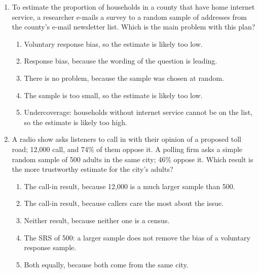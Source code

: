 \documentclass[12pt]{article}
\begin{document}
\begin{enumerate}[leftmargin=1.9em, itemsep=0.13in]
  \boxguard[13]
  \item To estimate the proportion of households in a county that have home internet service,
        a researcher e-mails a survey to a random sample of addresses from the county's
        e-mail newsletter list. Which is the main problem with this plan?
        \begin{enumerate}[label=\textbf{(\Alph*)}, leftmargin=2.2em, itemsep=2pt]
          \item Voluntary response bias, so the estimate is likely too low.
          \item Response bias, because the wording of the question is leading.
          \item There is no problem, because the sample was chosen at random.
          \item The sample is too small, so the estimate is likely too low.
          \item Undercoverage: households without internet service cannot be on the list,\\
                so the estimate is likely too high.\hfill{}\rule[-0.2in]{0pt}{0.48in}
        \end{enumerate}

  \boxguard[14]
  \item A radio show asks listeners to call in with their opinion of a proposed toll road;
        12{,}000 call, and 74\% of them oppose it. A polling firm asks a simple random sample
        of 500 adults in the same city; 46\% oppose it. Which result is the more trustworthy
        estimate for the city's adults?
        \begin{enumerate}[label=\textbf{(\Alph*)}, leftmargin=2.2em, itemsep=2pt]
          \item The call-in result, because 12{,}000 is a much larger sample than 500.
          \item The call-in result, because callers care the most about the issue.
          \item Neither result, because neither one is a census.
          \item The SRS of 500: a larger sample does not remove the bias of a voluntary\\
                response sample.
          \item Both equally, because both come from the same city.\hfill{}\rule[-0.2in]{0pt}{0.48in}
        \end{enumerate}


\end{enumerate}
\end{document}
